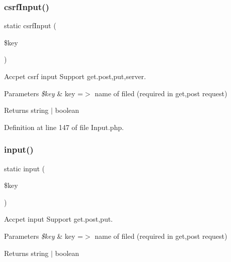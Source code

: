 \subsubsection{\texorpdfstring{csrf\+Input()}{csrfInput()}}
{\footnotesize\ttfamily static csrf\+Input (\begin{DoxyParamCaption}\item[{}]{\$key }\end{DoxyParamCaption})\hspace{0.3cm}{\ttfamily [static]}}

Accpet csrf input Support get.\+post,put,server.


\begin{DoxyParams}{Parameters}
{\em \$key} & \textquotesingle{}key\textquotesingle{} =$>$ name of filed (required in get,post request)\\
\hline
\end{DoxyParams}
\begin{DoxyReturn}{Returns}
string $\vert$ boolean 
\end{DoxyReturn}


Definition at line 147 of file Input.\+php.

\mbox{\label{class_zest_1_1_input_1_1_input_a3a0ac15a2db6f690f8cd1b4e59b12924}} 
\subsubsection{\texorpdfstring{input()}{input()}}
{\footnotesize\ttfamily static input (\begin{DoxyParamCaption}\item[{}]{\$key }\end{DoxyParamCaption})\hspace{0.3cm}{\ttfamily [static]}}

Accpet input Support get.\+post,put.


\begin{DoxyParams}{Parameters}
{\em \$key} & \textquotesingle{}key\textquotesingle{} =$>$ name of filed (required in get,post request)\\
\hline
\end{DoxyParams}
\begin{DoxyReturn}{Returns}
string $\vert$ boolean 
\end{DoxyReturn}



